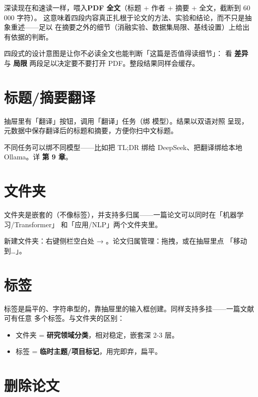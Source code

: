 深读现在和速读一样，喂入\textbf{PDF 全文}（标题 + 作者 + 摘要 + 全文，截断到 60\,000 字符）。
这意味着四段内容真正扎根于论文的方法、实验和结论，而不只是抽象重述——足以
在摘要之外的细节（消融实验、数据集局限、基线设置）上给出有依据的判断。

四段式的设计意图是让你不必读全文也能判断「这篇是否值得读细节」：
看 \textbf{差异} 与 \textbf{局限} 两段足以决定要不要打开 PDF。整段结果同样会缓存。

\section{标题/摘要翻译}

抽屉里有「翻译」按钮，调用「翻译」任务（绑  模型）。结果以双语对照
呈现，元数据中保存翻译后的标题和摘要，方便你扫中文标题。

\begin{tipbox}
不同任务可以绑不同模型——比如把 TL;DR 绑给 DeepSeek、把翻译绑给本地 Ollama。详
\textbf{第 9 章}。
\end{tipbox}

\section{文件夹}

文件夹是嵌套的（不像标签），并支持多归属——一篇论文可以同时在「机器学习/Transformer」
和「应用/NLP」两个文件夹里。


新建文件夹：右键侧栏空白处 → 。论文归属管理：拖拽，或在抽屉里点
「移动到…」。

\section{标签}

标签是扁平的、字符串型的，靠抽屉里的输入框创建。同样支持多挂——一篇文献可有任意
多个标签。与文件夹的区别：

\begin{itemize}
  \item 文件夹 = \textbf{研究领域分类}，相对稳定，嵌套深 2-3 层。
  \item 标签 = \textbf{临时主题/项目标记}，用完即弃，扁平。
\end{itemize}

\section{删除论文}

